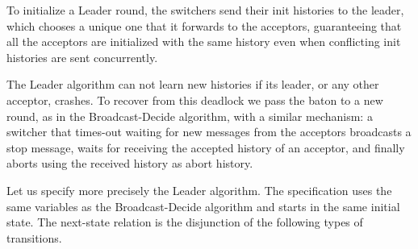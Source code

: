\documentclass{llncs}
\begin{document}
To initialize a Leader round, the switchers send their init histories to the leader, which chooses a unique one that it forwards to the acceptors, guaranteeing that all the acceptors are initialized with the same history even when conflicting init histories are sent concurrently.

The Leader algorithm can not learn new histories if its leader, or any other acceptor, crashes.
To recover from this deadlock we pass the baton to a new round, as in the Broadcast-Decide algorithm, with a similar mechanism: a switcher that times-out waiting for new messages from the acceptors broadcasts a stop message, waits for receiving the accepted history of an acceptor, and finally aborts using the received history as abort history. 

Let us specify more precisely the Leader algorithm.
The specification uses the same variables as the Broadcast-Decide algorithm and starts in the same initial state. 
The next-state relation is the disjunction of the following types of
transitions. 
\end{document}
